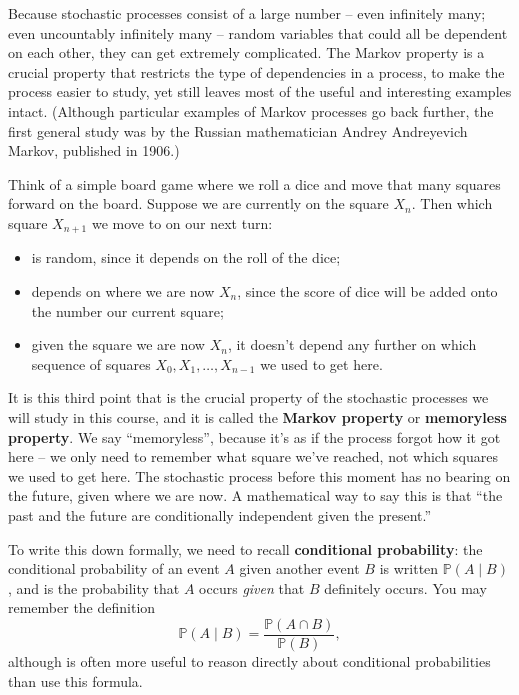 \documentclass[
  a4paper,
]{article}
\providecommand{\tightlist}{%
  \setlength{\itemsep}{0pt}\setlength{\parskip}{0pt}}
\theoremstyle{definition}
\theoremstyle{definition}
\theoremstyle{definition}
\theoremstyle{remark}
\begin{document}
Because stochastic processes consist of a large number -- even infinitely many; even uncountably infinitely many -- random variables that could all be dependent on each other, they can get extremely complicated. The Markov property is a crucial property that restricts the type of dependencies in a process, to make the process easier to study, yet still leaves most of the useful and interesting examples intact. (Although particular examples of Markov processes go back further, the first general study was by the Russian mathematician Andrey Andreyevich Markov, published in 1906.)

Think of a simple board game where we roll a dice and move that many squares forward on the board. Suppose we are currently on the square \(X_n\). Then which square \(X_{n+1}\) we move to on our next turn:

\begin{itemize}
\tightlist
\item
  is random, since it depends on the roll of the dice;
\item
  depends on where we are now \(X_n\), since the score of dice will be added onto the number our current square;
\item
  given the square we are now \(X_n\), it doesn't depend any further on which sequence of squares \(X_0, X_1, \dots, X_{n-1}\) we used to get here.
\end{itemize}

It is this third point that is the crucial property of the stochastic processes we will study in this course, and it is called the \textbf{Markov property} or \textbf{memoryless property}. We say ``memoryless'', because it's as if the process forgot how it got here -- we only need to remember what square we've reached, not which squares we used to get here. The stochastic process before this moment has no bearing on the future, given where we are now. A mathematical way to say this is that ``the past and the future are conditionally independent given the present.''

To write this down formally, we need to recall \textbf{conditional probability}: the conditional probability of an event \(A\) given another event \(B\) is written \(\mathbb P(A \mid B)\), and is the probability that \(A\) occurs \emph{given} that \(B\) definitely occurs. You may remember the definition
\[ \mathbb P(A \mid B) = \frac{\mathbb P(A \cap B)}{\mathbb P(B)} , \]
although is often more useful to reason directly about conditional probabilities than use this formula.
\end{document}
